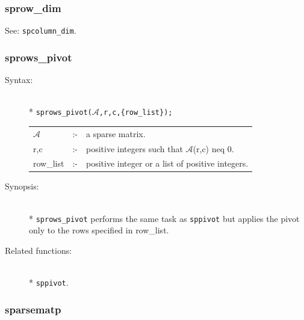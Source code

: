 \subsubsection{sprow\_dim}
\label{sparse:sprow_dim}
\hypertarget{operator:SPROW_DIM}{}

See: \texttt{spcolumn\_dim}.


\subsubsection{sprows\_pivot}
\label{sparse:sprows_pivot}
\hypertarget{operator:SPROWS_PIVOT}{}

\begin{description}
\item[Syntax:]\mbox{}\\*
{\tt sprows\_pivot($\mathcal{A}$,r,c,\{row\_list\});}\\[2mm]
\begin{tabular}{l l l}
$\mathcal{A}$ &:-& a sparse matrix. \\
r,c        &:-& positive integers such that $\mathcal{A}$(r,c) neq 0.\\
row\_list  &:-& positive integer or a list of positive integers.
\end{tabular}

\item[Synopsis:]\mbox{}\\*
\texttt{sprows\_pivot} performs the same task as \texttt{sppivot} but applies
the pivot only to the rows specified in row\_list.

\item[Related functions:]\mbox{}\\*
\texttt{sppivot}.
\end{description}

\subsubsection{sparsematp}
\label{sparse:sparsematp}
\hypertarget{operator:SPARSEMATP}{}

